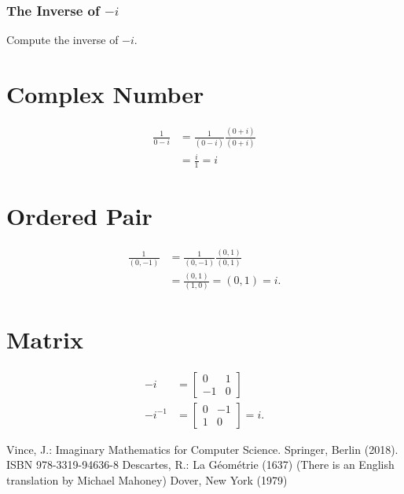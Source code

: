 \subsubsection{The Inverse of $-i$}
Compute the inverse of $-i$.

\section{Complex Number}
$$
\begin{aligned}
\frac{1}{0-i} & =\frac{1}{(0-i)} \frac{(0+i)}{(0+i)} \\
& =\frac{i}{1}=i
\end{aligned}
$$

\section{Ordered Pair}
$$
\begin{aligned}
\frac{1}{(0,-1)} & =\frac{1}{(0,-1)} \frac{(0,1)}{(0,1)} \\
& =\frac{(0,1)}{(1,0)}=(0,1)=i .
\end{aligned}
$$

\section{Matrix}
$$
\begin{aligned}
-i & =\left[\begin{array}{cc}
0 & 1 \\
-1 & 0
\end{array}\right] \\
-i^{-1} & =\left[\begin{array}{cc}
0 & -1 \\
1 & 0
\end{array}\right]=i .
\end{aligned}
$$

\begin{thebibliography}{99}
   Vince, J.: Imaginary Mathematics for Computer Science. Springer, Berlin (2018). ISBN 978-3319-94636-8
   Descartes, R.: La Géométrie (1637) (There is an English translation by Michael Mahoney) Dover, New York (1979)
\end{thebibliography}
